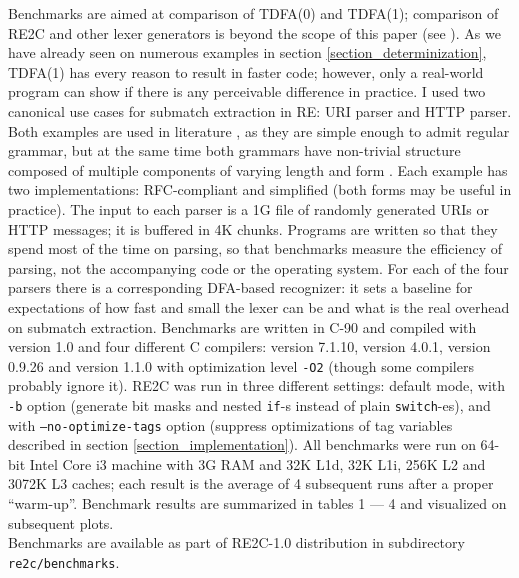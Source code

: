 \documentclass{article}
\theoremstyle{definition}
\begin{document}
\begin{multicols}{2}
Benchmarks are aimed at comparison of TDFA(0) and TDFA(1);
comparison of RE2C and other lexer generators is beyond the scope of this paper (see \cite{BC93}).
As we have already seen on numerous examples in section \ref{section_determinization},
TDFA(1) has every reason to result in faster code;
however, only a real-world program can show if there is any perceivable difference in practice.
I used two canonical use cases for submatch extraction in RE: URI parser and HTTP parser.
Both examples are used in literature \cite{BT10} \cite{GHRST16},
as they are simple enough to admit regular grammar,
but at the same time both grammars have non-trivial structure composed of multiple components of varying length and form \cite{RFC-3986} \cite{RFC-7230}.
Each example has two implementations: RFC-compliant and simplified (both forms may be useful in practice).
The input to each parser is a 1G file of randomly generated URIs or HTTP messages; it is buffered in 4K chunks.
Programs are written so that they spend most of the time on parsing,
so that benchmarks measure the efficiency of parsing, not the accompanying code or the operating system.
For each of the four parsers there is a corresponding DFA-based recognizer:
it sets a baseline for expectations of how fast and small the lexer can be and what is the real overhead on submatch extraction.
Benchmarks are written in C-90 and compiled with \cite{RE2C} version 1.0
and four different C compilers:
\cite{GCC} version 7.1.10,
\cite{Clang} version 4.0.1,
\cite{TCC} version 0.9.26
and \cite{PCC} version 1.1.0
with optimization level \texttt{-O2} (though some compilers probably ignore it).
RE2C was run in three different settings:
default mode, with \texttt{-b} option (generate bit masks and nested \texttt{if}-s instead of plain \texttt{switch}-es),
and with \texttt{--no-optimize-tags} option (suppress optimizations of tag variables described in section \ref{section_implementation}).
All benchmarks were run on 64-bit Intel Core i3 machine with 3G RAM and 32K L1d, 32K L1i, 256K L2 and 3072K L3 caches;
each result is the average of 4 subsequent runs after a proper ``warm-up''.
Benchmark results are summarized in tables 1 --- 4
and visualized on subsequent plots.
\\

Benchmarks are available as part of RE2C-1.0 distribution
in subdirectory \texttt{re2c/benchmarks}.

\end{multicols}
\end{document}
